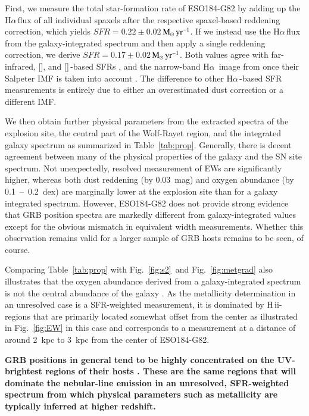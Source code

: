 \documentclass[traditabstract, referee]{aa}
\newcommand{\ha}{H$\alpha$}
\newcommand{\hii}{\mbox{H\,{\sc ii}}}
\newcommand{\oi}{[\ion{O}{i}]}
\newcommand{\cii}{[\ion{C}{ii}]}
\newcommand{\Msunyr}{$\mathrm{M}_\odot\,\rm{yr}^{-1}$}
\begin{document}
First, we measure the total star-formation rate of ESO184-G82 by adding up the \ha\,flux of all individual spaxels after the respective spaxel-based reddening correction, which yields $SFR=0.22\pm0.02$\,\Msunyr. If we instead use the \ha\,flux from the galaxy-integrated spectrum and then apply a single reddening correction, we derive $SFR=0.17\pm0.02$\,\Msunyr. Both values agree with far-infrared, \oi, and \cii\,-based SFRs \citep{2014A&A...562A..70M, 2016arXiv160901742M}, and the narrow-band \ha\, image from \citet{2005NewA...11..103S} once their Salpeter IMF is taken into account \citep[see also][]{2009ApJ...691..182S}. The difference to other \ha\,-based SFR measurements \citep{2006A&A...454..103H, 2008A&A...490...45C} is entirely due to either an overestimated dust correction or a different IMF.

We then obtain further physical parameters from the extracted spectra of the explosion site, the central part of the Wolf-Rayet region, and the integrated galaxy spectrum as summarized in Table~\ref{tab:prop}. Generally, there is decent agreement between many of the physical properties of the galaxy and the SN site spectrum. Not unexpectedly, resolved measurement of EWs are significantly higher, whereas both dust reddening (by 0.03~mag) and oxygen abundance (by 0.1~--~0.2~dex) are marginally lower at the explosion site than for a galaxy integrated spectrum. However, ESO184-G82 does not provide strong evidence that GRB position spectra are markedly different from galaxy-integrated values except for the obvious mismatch in equivalent width measurements. Whether this observation remains valid for a larger sample of GRB hosts remains to be seen, of course.

Comparing Table~\ref{tab:prop} with Fig.~\ref{fig:s2}~and Fig.~\ref{fig:metgrad} also illustrates that the oxygen abundance derived from a galaxy-integrated spectrum is not the central abundance of the galaxy \citep[see also e.g.,][]{2016A&A...591A..48G}. As the metallicity determination in an unresolved case is a SFR-weighted measurement, it is dominated by \hii-regions that are primarily located somewhat offset from the center as illustrated in Fig.~\ref{fig:EW} in this case and corresponds to a measurement at a distance of around 2~kpc to 3~kpc from the center of ESO184-G82. 

\textbf{GRB positions in general tend to be highly concentrated on the UV-brightest regions of their hosts \citep[e.g.,][]{2010MNRAS.405...57S, 2016ApJ...817..144B, 2017MNRAS.tmp..220L}. These are the same regions that will dominate the nebular-line emission in an unresolved, SFR-weighted spectrum from which physical parameters such as metallicity are typically inferred at higher redshift.}
\end{document}
